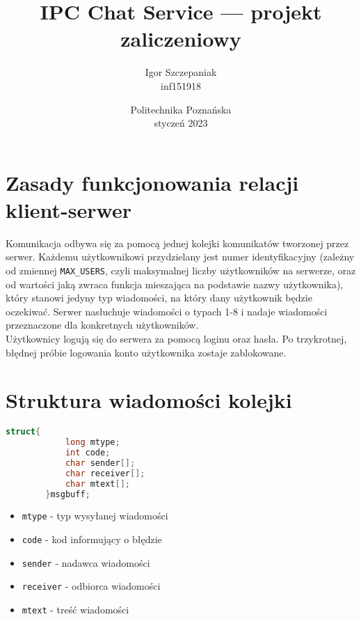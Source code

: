 \documentclass{article}
\begin{document}
	\title{IPC Chat Service — projekt zaliczeniowy}
	\date{Politechnika Poznańska\\ styczeń 2023}
	\author{Igor Szczepaniak\\ inf151918}
	\maketitle
	\section{Zasady funkcjonowania relacji klient-serwer}
		Komunikacja odbywa się za pomocą jednej kolejki komunikatów tworzonej przez serwer. Każdemu użytkownikowi przydzielany jest numer identyfikacyjny (zależny od zmiennej \verb+MAX_USERS+, czyli maksymalnej liczby użytkowników na serwerze, oraz od wartości jaką zwraca funkcja mieszająca na podstawie nazwy użytkownika), który stanowi jedyny typ wiadomości, na który dany użytkownik będzie oczekiwać. Serwer nasłuchuje wiadomości o typach 1-8 i nadaje wiadomości przeznaczone dla konkretnych użytkowników.\\
		Użytkownicy logują się do serwera za pomocą loginu oraz hasła. Po trzykrotnej, błędnej próbie logowania konto użytkownika zostaje zablokowane.
	\section{Struktura wiadomości kolejki}
	\begin{lstlisting}[language=C]
		struct{
			long mtype;
			int code;
			char sender[];
			char receiver[];
			char mtext[];
		}msgbuff;
	\end{lstlisting}

	\begin{itemize}
		\item \verb+mtype+ - typ wysyłanej wiadomości
		\item \verb+code+ - kod informujący o błędzie
		\item \verb+sender+ - nadawca wiadomości
		\item \verb+receiver+ - odbiorca wiadomości
		\item \verb+mtext+ - treść wiadomości
	\end{itemize}
	
	\newpage
\end{document}
